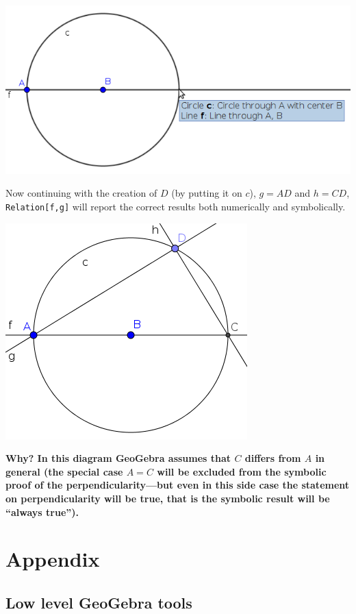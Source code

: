 \documentclass{article}
\begin{document}
\begin{enumerate}
\begin{enumerate}
\begin{center}
\includegraphics[scale=0.5]{limitations-Thales2-3}
\end{center}
      Now continuing with the creation of $D$ (by putting it on $c$), $g=AD$ and $h=CD$, \texttt{Relation[f,g]} will report the correct results both numerically and symbolically.
\begin{center}
\includegraphics[scale=0.5]{limitations-Thales2-4}
\end{center}
      \textbf{Why? In this diagram GeoGebra assumes that $C$ differs from $A$ in general (the special case $A=C$ will be excluded from the symbolic proof of the perpendicularity---but even in this side case the statement on perpendicularity will be true, that is the symbolic result will be ``always true'').}
    \end{enumerate}
\end{enumerate}


\section{Appendix}
\subsection{Low level GeoGebra tools}
\end{document}
